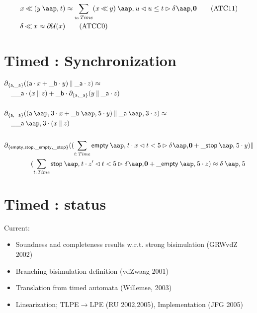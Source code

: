 \begin{slide}
\begin{footnotesize}
\begin{align}
&  x\tb(y\at t)\id \sum_{u\ap\Time}(x\tb y)\at u\lcond u\leq t\rcond\daz\tag{ATC11}\label{eq:ATC11}\\ %
&  \delta\tb x\id \udd(x)\tag{ATCC0}\label{eq:ATCC0} %
  \end{align}
\end{footnotesize}
\newslide\section*{Timed \mcrl: Synchronization}
\vspace{-1.5ex}
\begin{footnotesize}
  \begin{align*}
&  \encap{\set{\act{a},\act{\_a}}} ((\act{a}\seqc x+\act{\_b}\seqc y)\parc \act{\_a}\seqc z)\id\\
&  \quad\act{\_\_a}\seqc (x\parc z)+\act{\_b}\seqc\encap{\set{\act{a},\act{\_a}}} (y\parc\act{\_a}\seqc z)\\
&  \\
&  \encap{\set{\act{a},\act{\_a}}} ((\act{a}\at 3\seqc x+\act{\_b}\at 5\seqc y)\parc \act{\_a}\at 3\seqc z)\id\\
&  \quad\act{\_\_a}\at 3\seqc (x\parc z)\\ 
&  \\
&  \encap{\set{\act{empty},\act{stop},\act{\_empty},\act{\_stop}}} ((\sum_{t\ap\Time}\act{empty}\at t\seqc x\lcond t<5\rcond\daz+\act{\_stop}\at 5\seqc y)\parc\\
&\t4 (\sum_{t\ap\Time}\act{stop}\at t\seqc z'\lcond t<5\rcond\daz+\act{\_empty}\at 5\seqc z)\id\delta\at 5 
  \end{align*}
\end{footnotesize}
\newslide\section*{Timed \mcrl: status}
Current:
\begin{itemize}
\item Soundness and completeness results w.r.t. strong bisimulation (GRWvdZ 2002)
\item Branching bisimulation definition (vdZwaag 2001)
\item Translation from timed automata (Willemse, 2003)
\item Linearization; TLPE$\to$LPE (RU 2002,2005), Implementation (JFG 2005)

\end{itemize}
\end{slide}
